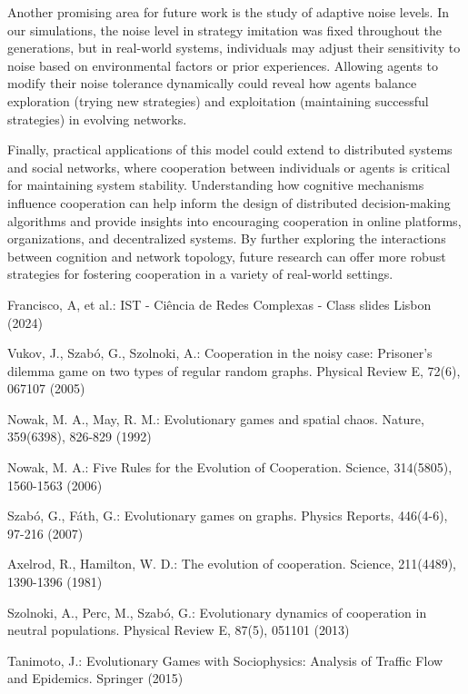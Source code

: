 \documentclass[runningheads]{llncs}
\begin{document}
Another promising area for future work is the study of adaptive noise levels. In our simulations, the noise level in strategy imitation was fixed throughout the generations, but in real-world systems, individuals may adjust their sensitivity to noise based on environmental factors or prior experiences. Allowing agents to modify their noise tolerance dynamically could reveal how agents balance exploration (trying new strategies) and exploitation (maintaining successful strategies) in evolving networks.

Finally, practical applications of this model could extend to distributed systems and social networks, where cooperation between individuals or agents is critical for maintaining system stability. Understanding how cognitive mechanisms influence cooperation can help inform the design of distributed decision-making algorithms and provide insights into encouraging cooperation in online platforms, organizations, and decentralized systems. By further exploring the interactions between cognition and network topology, future research can offer more robust strategies for fostering cooperation in a variety of real-world settings.

%
%
% 
% 
%
\begin{thebibliography}{8}
Francisco, A, et al.: IST - Ciência de Redes Complexas - Class slides
Lisbon (2024)


Vukov, J., Szabó, G., Szolnoki, A.: Cooperation in the noisy case: Prisoner's dilemma game on two types of regular random graphs. Physical Review E, 72(6), 067107 (2005)

Nowak, M. A., May, R. M.: Evolutionary games and spatial chaos. Nature, 359(6398), 826-829 (1992)

Nowak, M. A.: Five Rules for the Evolution of Cooperation. Science, 314(5805), 1560-1563 (2006)

Szabó, G., Fáth, G.: Evolutionary games on graphs. Physics Reports, 446(4-6), 97-216 (2007)

Axelrod, R., Hamilton, W. D.: The evolution of cooperation. Science, 211(4489), 1390-1396 (1981)

Szolnoki, A., Perc, M., Szabó, G.: Evolutionary dynamics of cooperation in neutral populations. Physical Review E, 87(5), 051101 (2013)

Tanimoto, J.: Evolutionary Games with Sociophysics: Analysis of Traffic Flow and Epidemics. Springer (2015)

\end{thebibliography}
\end{document}
